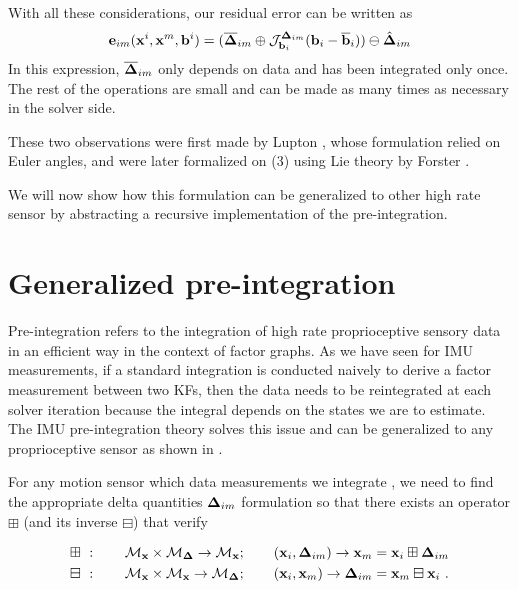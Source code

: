 With all these considerations, our residual error can be written as
%
\begin{align}
    {\bf e}_{im}({\bf x}^i, {\bf x}^m, {\bf b}^i) = (\overline{{\bm \Delta}}_{im} \oplus {\mathcal{J}^{{\bm \Delta}_{im}}_{{\bf b}_i}}({\bf b}_i-\overline{{\bf b}}_i) ) \ominus \hat{{\bm \Delta}}_{im}
    \label{eq:preint_residual}
\end{align}
%
In this expression, $\overline{{\bm \Delta}}_{im}$ only depends on data and has been integrated only once. The rest of the operations are small and can be made as many times as necessary in the solver side.

These two observations were first made by Lupton \cite{lupton-09}, whose formulation relied on Euler angles, and were later formalized on \SO(3) using Lie theory
by Forster \cite{forster2017-TRO}. 

We will now show how this formulation can be generalized to other high rate sensor by abstracting a recursive implementation of the pre-integration.



\section{Generalized pre-integration}
\label{sec:general-preint}


Pre-integration refers to the integration of high rate proprioceptive sensory data in an efficient way in the context of factor graphs. 
As we have seen for IMU measurements, if a standard integration is conducted naively to derive a factor measurement between two KFs, 
then the data needs to be reintegrated at each solver iteration because the integral depends on the states we are to estimate. 
The IMU pre-integration theory solves this issue and can be generalized to any proprioceptive sensor as shown in \cite{atchuthan-18-thesis,deray-19-selfcalib,fourmy2021contact}. 

For any motion sensor which data measurements we integrate , we need to find the appropriate delta quantities ${\bm \Delta}_{im}$ formulation so that there exists an operator $\boxplus$ (and its inverse $\boxminus$) that verify

\begin{align}
    \boxplus~&: \quad\quad \mathcal{M}_{{\bf x}} \times \mathcal{M}_{{\bm \Delta}} \rightarrow \mathcal{M}_{{\bf x}}; 
    \quad\quad ({\bf x}_i,{\bm \Delta}_{im}) \rightarrow {\bf x}_m={\bf x}_i\boxplus {\bm \Delta}_{im} \\
    \boxminus~&: \quad\quad \mathcal{M}_{{\bf x}} \times \mathcal{M}_{{\bf x}} \rightarrow \mathcal{M}_{{\bm \Delta}}; 
    \quad\quad ({\bf x}_i,{\bf x}_m) \rightarrow {\bm \Delta}_{im}={\bf x}_m\boxminus {\bf x}_i~.
\end{align}

